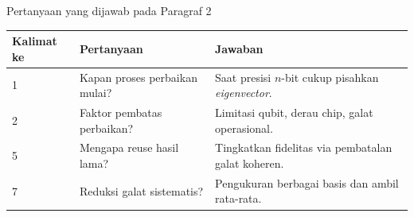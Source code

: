 \begin{frame}{Pertanyaan yang dijawab pada Paragraf 2}
    \centering
    \small
    \begin{tabular}{lp{4.5cm}p{6cm}}
        \toprule
        Kalimat ke & Pertanyaan & Jawaban \\
        \midrule
        1 & Kapan proses perbaikan mulai? & Saat presisi $n$-bit cukup pisahkan \textit{eigenvector}. \\
        2 & Faktor pembatas perbaikan? & Limitasi qubit, derau chip, galat operasional. \\
        5 & Mengapa reuse hasil lama? & Tingkatkan fidelitas via pembatalan galat koheren. \\
        7 & Reduksi galat sistematis? & Pengukuran berbagai basis dan ambil rata-rata. \\
        \bottomrule
    \end{tabular}
\end{frame}
